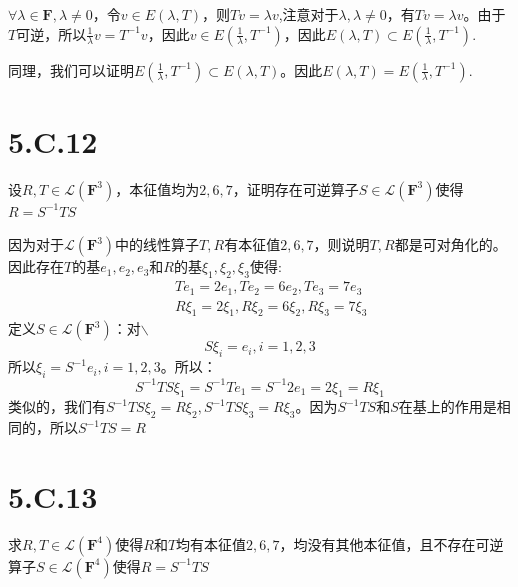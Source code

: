 \documentclass[10pt,a4paper,UTF8]{article}
\begin{document}
\begin{answer}
\(\forall \lambda \in \mathbf{F},\lambda\neq 0\)，令\(v\in E(\lambda,T)\)，则\(Tv = \lambda v\),注意对于\(\lambda,\lambda\neq 0\)，有\(Tv = \lambda v\)。由于\(T\)可逆，所以\(\frac{1}{\lambda}v = T^{-1}v\)，因此\(v\in E( \frac{1}{\lambda},T^{-1})\)，因此\(E(\lambda,T)\subset E(\frac{1}{\lambda},T^{-1})\).

同理，我们可以证明\(E(\frac{1}{\lambda},T^{-1}) \subset E(\lambda,T)\)。因此\(E(\lambda,T) = E(\frac{1}{\lambda},T^{-1})\).
\end{answer}
\section{5.C.12}
\label{sec:org4ebf389}


\begin{problem}
设\(R,T\in \mathcal{L}( \mathbf{F}^{3} )\)，本征值均为\(2,6,7\)，证明存在可逆算子\(S\in \mathcal{L}( \mathbf{F}^{3} )\)使得\(R = S^{-1}TS\)
\end{problem}

\begin{answer}
因为对于\(\mathcal{L}(\mathbf{F}^{3})\)中的线性算子\(T,R\)有本征值\(2,6,7\)，则说明\(T,R\)都是可对角化的。因此存在\(T\)的基\(e_{1},e_{2},e_{3}\)和\(R\)的基\(\xi_{1},\xi_{2},\xi_{3}\)使得:
\begin{eqnarray}
\label{eq:12}
& &Te_{1} = 2e_{1},Te_{2} = 6e_{2}, Te_{3} = 7e_{3} \\
& &R\xi_{1} = 2\xi_{1},R\xi_{2} = 6\xi_{2}, R\xi_{3} = 7\xi_{3}
\end{eqnarray}
定义\(S\in \mathcal{L}(\mathbf{F}^{3})\)：对$\backslash$
\begin{equation}
\label{eq:13}
S\xi_{i} = e_{i},i = 1,2,3
\end{equation}
所以\(\xi_{i} = S^{-1}e_{i},i=1,2,3\)。所以：
\begin{equation}
\label{eq:14}
S^{-1}TS\xi_{1} = S^{-1}Te_{1} =  S^{-1} 2 e_{1} = 2 \xi_{1} = R\xi_{1}
\end{equation}
类似的，我们有\(S^{-1}TS \xi_{2} = R \xi_{2},S^{-1}TS\xi_{3} = R \xi_{3}\)。因为\(S^{-1}TS\)和\(S\)在基上的作用是相同的，所以\(S^{-1}TS = R\)
\end{answer}
\section{5.C.13}
\label{sec:orgf01880d}


\begin{problem}
求\(R,T\in \mathcal{L}(\mathbf{F}^{4})\)使得\(R\)和\(T\)均有本征值\(2,6,7\)，均没有其他本征值，且不存在可逆算子\(S\in \mathcal{L}(\mathbf{F}^{4})\)使得\(R=S^{-1}TS\)
\end{problem}
\end{document}
